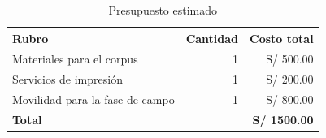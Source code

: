 \begin{table}[htbp]
  \centering
  \caption{Presupuesto estimado}
  \label{tab:presupuesto}
  \small
  \begin{tabularx}{\textwidth}{@{}Xrr@{}}
    \toprule
    \textbf{Rubro} & \textbf{Cantidad} & \textbf{Costo total} \\
    \midrule
    Materiales para el corpus & 1 & S/ 500.00 \\
    Servicios de impresión & 1 & S/ 200.00 \\
    Movilidad para la fase de campo & 1 & S/ 800.00 \\
    \midrule
    \textbf{Total} & & \textbf{S/ 1500.00} \\
    \bottomrule
  \end{tabularx}
\end{table}
